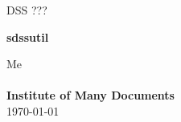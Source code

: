\begingroup\thispagestyle{empty}%
\hfill%
%
  DSS ???
%
\\%
%
\ifx\userdraft\undefined\else%
\vspace*{-9.2ex}%
\begin{center}%
{\Huge{}}%
\end{center}%
\vspace*{1ex}%
\fi%
%
%
%
\vspace*{2ex}
\begin{center}
   \LARGE\bf
%
%                
sdssutil
%
\end{center}
%
%
%
\vspace*{1ex}
\vspace{4ex}
\begin{center}
%
Me\\
\ \\
{\bf Institute of Many Documents}\\
\today
%
\end{center}
